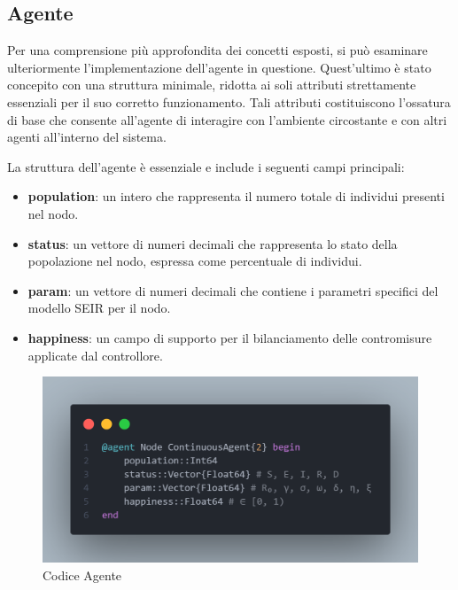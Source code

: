 \subsection{Agente}

Per una comprensione più approfondita dei concetti esposti, 
si può esaminare ulteriormente l'implementazione dell'agente in questione. 
Quest'ultimo è stato concepito con una struttura minimale, 
ridotta ai soli attributi strettamente essenziali per il suo corretto 
funzionamento. Tali attributi costituiscono l'ossatura di base che 
consente all'agente di interagire con l'ambiente circostante e con 
altri agenti all'interno del sistema.

La struttura dell'agente è essenziale e include i seguenti campi principali:

\begin{itemize}
	\item \textbf{population}: un intero che rappresenta il numero totale 
	di individui presenti nel nodo.
	\item \textbf{status}: un vettore di numeri decimali che 
	rappresenta lo stato della popolazione nel nodo, espressa 
	come percentuale di individui.
	\item \textbf{param}: un vettore di numeri decimali che contiene 
	i parametri specifici del modello SEIR per il nodo.
	\item \textbf{happiness}: un campo di supporto per il bilanciamento 
	delle contromisure applicate dal controllore.
\end{itemize}

\begin{figure}[H]
    \begin{center}
		\includegraphics[width=\textwidth]{img/node_agent.png}
		\caption{Codice Agente}
		\label{fig:Agent_code}
	\end{center}
\end{figure}

